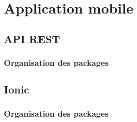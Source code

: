 \chapter{Application mobile}
	\section{API REST}
		\subsection{Organisation des packages}

	\section{Ionic}
		\subsection{Organisation des packages}
